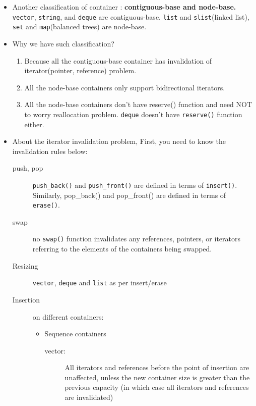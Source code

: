 \documentclass[a4paper,11pt,twoside]{book}
\begin{document}
\begin{itemize}
	\item Another classification of container : \textbf{contiguous-base and node-base.} \texttt{vector}, \texttt{string}, and \texttt{deque} are contiguous-base. \texttt{list} and \texttt{slist}(linked list), \texttt{set} and \texttt{map}(balanced trees) are node-base.


	\item Why we have such classification? 
\begin{enumerate}
	\item Because all the contiguous-base container has invalidation of iterator(pointer, reference) problem. 

	\item All the node-base containers only support bidirectional iterators. 

	\item All the node-base containers don't have reserve() function and need NOT to worry reallocation problem. \texttt{deque} doesn't have \texttt{reserve()} function either. 
\end{enumerate}

	\item About the iterator invalidation problem,  First, you need to know the invalidation rules below: 

\begin{description}
	
\item[push, pop]
\texttt{push\_back()} and \texttt{push\_front()} are defined in terms of \texttt{insert()}. Similarly, pop\_back() and pop\_front() are defined in terms of \texttt{erase()}.

\item[swap]
no \texttt{swap()} function invalidates any references, pointers, or iterators referring to the elements of the containers being swapped.

\item[Resizing]
\texttt{vector}, \texttt{deque} and \texttt{list} as per insert/erase

\item[Insertion] on different containers:

\begin{itemize}
\item Sequence containers
		\begin{description}
		\item [vector:] All iterators and references before the point of insertion are unaffected, unless the new container size is greater than the previous capacity (in which case all iterators and references are invalidated)
		

\end{description}
\end{itemize}
\end{description}
\end{itemize}
\end{document}
